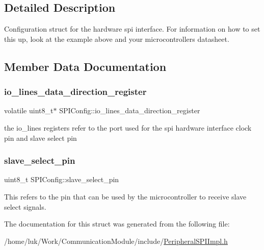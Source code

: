 \subsection{Detailed Description}
Configuration struct for the hardware spi interface. For information on how to set this up, look at the example above and your microcontrollers datasheet. 

\subsection{Member Data Documentation}
\mbox{\label{structSPIConfig_a47bdd945a9c31fd85bec22639226c2b3}} 
\subsubsection{\texorpdfstring{io\+\_\+lines\+\_\+data\+\_\+direction\+\_\+register}{io\_lines\_data\_direction\_register}}
{\footnotesize\ttfamily volatile uint8\+\_\+t$\ast$ S\+P\+I\+Config\+::io\+\_\+lines\+\_\+data\+\_\+direction\+\_\+register}

the io\+\_\+lines registers refer to the port used for the spi hardware interface clock pin and slave select pin \mbox{\label{structSPIConfig_a9c74ff0289f0c19aa56fa31def406e05}} 
\subsubsection{\texorpdfstring{slave\+\_\+select\+\_\+pin}{slave\_select\_pin}}
{\footnotesize\ttfamily uint8\+\_\+t S\+P\+I\+Config\+::slave\+\_\+select\+\_\+pin}

This refers to the pin that can be used by the microcontroller to receive slave select signals. 

The documentation for this struct was generated from the following file\+:\begin{DoxyCompactItemize}
\item 
/home/luk/\+Work/\+Communication\+Module/include/\mbox{\hyperlink{PeripheralSPIImpl_8h}{Peripheral\+S\+P\+I\+Impl.\+h}}\end{DoxyCompactItemize}
